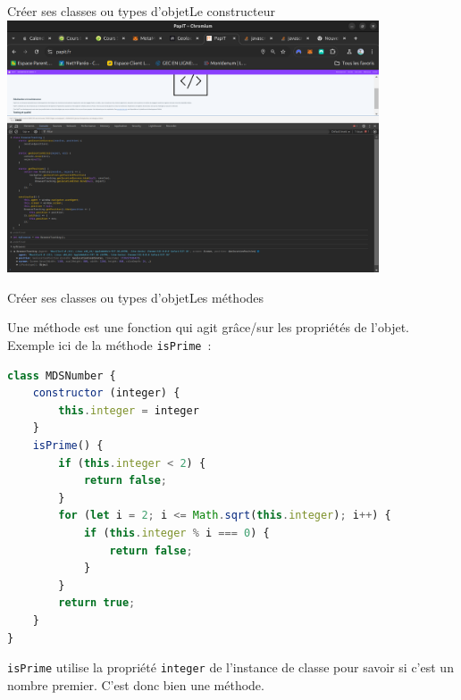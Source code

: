 \documentclass{beamer}
\begin{document}
    \begin{frame}{Créer ses classes ou types d'objet}{Le constructeur}
        \centering
        \includegraphics[width=11cm]{image/browser-tracker}
    \end{frame}


    \begin{frame}[fragile]{Créer ses classes ou types d'objet}{Les méthodes}
        \begin{footnotesize}
            Une méthode est une fonction qui agit grâce/sur les propriétés de l'objet.
            Exemple ici de la méthode \lstinline{isPrime}~:
            \begin{lstlisting}[language=JavaScript,title={\scriptsize{Script JavaScript}},basicstyle=\tiny\ttfamily]
class MDSNumber {
    constructor (integer) {
        this.integer = integer
    }
    isPrime() {
        if (this.integer < 2) {
            return false;
        }
        for (let i = 2; i <= Math.sqrt(this.integer); i++) {
            if (this.integer % i === 0) {
                return false;
            }
        }
        return true;
    }
}
            \end{lstlisting}
            \lstinline{isPrime} utilise la propriété \lstinline{integer} de l'instance de classe pour savoir si c'est un nombre premier.
            C'est donc bien une méthode.
        \end{footnotesize}
    \end{frame}
\end{document}
